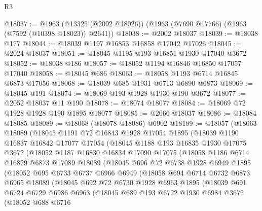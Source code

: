 \begin{lexlean}{R3}
\begin{coremodule}
@18037 := @1963 (@13325 (@2092 @18026)) (@1963 (@7690 @17766) (@1963 (@7592 (@10398 @18023)) @2641))
@18038 := @2002 @18037
@18039 := @18038 @177
@18044 := @18039 @1197 @16853 @16858 @17042 @17026
@18045 := @2024 @18037
@18051 := @18045 @1195 @193 @16851 @1930 @17040 @3672
@18052 := @18038 @186
@18057 := @18052 @1194 @16846 @16850 @17057 @17040
@18058 := @18045 @686
@18063 := @18058 @1193 @6714 @16845 @6873 @17056
@18068 := @18039 @685 @1931 @6713 @6890 @6873
@18069 := @18045 @191
@18074 := @18069 @193 @1928 @1930 @190 @3672
@18077 := @2052 @18037 @11 @190
@18078 := @18074 @18077
@18084 := @18069 @72 @1928 @1928 @190 @1895 @18077
@18085 := @2066 @18037
@18086 := @18084 @18085
@18089 := @18068 (@18078 @18086) @6902
@18189 := @18057
    (@18063
      @18089
      (@18045
        @1191
        @72
        @16843
        @1928
        @17054
        @1895
        (@18039
          @1190
          @16837
          @16842
          @17077
          @17054
          (@18045
            @1188
            @193
            @16835
            @1930
            @17075
            @3672
            (@18052
              @1187
              @16830
              @16834
              @17090
              @17075
              (@18058
                @1186
                @6714
                @16829
                @6873
                @17089
                @18089
                (@18045
                  @696
                  @72
                  @6738
                  @1928
                  @6949
                  @1895
                  (@18052
                    @695
                    @6733
                    @6737
                    @6966
                    @6949
                    (@18058
                      @694
                      @6714
                      @6732
                      @6873
                      @6965
                      @18089
                      (@18045
                        @692
                        @72
                        @6730
                        @1928
                        @6963
                        @1895
                        (@18039
                          @691
                          @6724
                          @6729
                          @6986
                          @6963
                          (@18045
                            @689
                            @193
                            @6722
                            @1930
                            @6984
                            @3672
                            (@18052
                              @688
                              @6716

\end{coremodule}
\end{lexlean}
